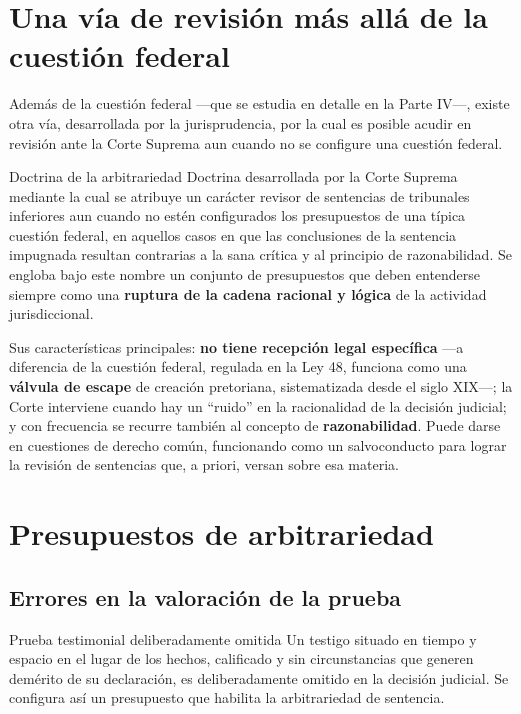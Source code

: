 \documentclass[12pt,oneside]{book}
\begin{document}
\section{Una vía de revisión más allá de la cuestión federal}

Además de la cuestión federal ---que se estudia en detalle en la Parte IV---, existe otra vía, desarrollada por la jurisprudencia, por la cual es posible acudir en revisión ante la Corte Suprema aun cuando no se configure una cuestión federal.

\begin{definition}{Doctrina de la arbitrariedad}
Doctrina desarrollada por la Corte Suprema mediante la cual se atribuye un carácter revisor de sentencias de tribunales inferiores aun cuando no estén configurados los presupuestos de una típica cuestión federal, en aquellos casos en que las conclusiones de la sentencia impugnada resultan contrarias a la sana crítica y al principio de razonabilidad. Se engloba bajo este nombre un conjunto de presupuestos que deben entenderse siempre como una \textbf{ruptura de la cadena racional y lógica} de la actividad jurisdiccional.
\end{definition}

Sus características principales: \textbf{no tiene recepción legal específica} ---a diferencia de la cuestión federal, regulada en la Ley 48, funciona como una \textbf{válvula de escape} de creación pretoriana, sistematizada desde el siglo XIX---; la Corte interviene cuando hay un ``ruido'' en la racionalidad de la decisión judicial; y con frecuencia se recurre también al concepto de \textbf{razonabilidad}. Puede darse en cuestiones de derecho común, funcionando como un salvoconducto para lograr la revisión de sentencias que, a priori, versan sobre esa materia.

\section{Presupuestos de arbitrariedad}

\subsection{Errores en la valoración de la prueba}

\begin{example}{Prueba testimonial deliberadamente omitida}
Un testigo situado en tiempo y espacio en el lugar de los hechos, calificado y sin circunstancias que generen demérito de su declaración, es deliberadamente omitido en la decisión judicial. Se configura así un presupuesto que habilita la arbitrariedad de sentencia.
\end{example}
\end{document}
